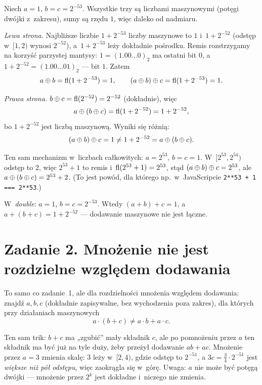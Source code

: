 \documentclass[11pt]{article}
\begin{document}
\formalnie
Niech $a=1$, $b=c=2^{-53}$. Wszystkie trzy są liczbami maszynowymi
(potęgi dwójki z~zakresu), sumy są rzędu $1$, więc daleko od nadmiaru.

\emph{Lewa strona.} Najbliższe liczbie $1+2^{-53}$ liczby maszynowe to $1$
i~$1+2^{-52}$ (odstęp w~$[1,2)$ wynosi $2^{-52}$), a~$1+2^{-53}$ leży
dokładnie pośrodku. Remis rozstrzygamy na korzyść parzystej mantysy:
$1=(1.00\ldots0)_2$ ma ostatni bit $0$, a~$1+2^{-52}=(1.00\ldots01)_2$ --- bit
$1$. Zatem
\[
a\mathbin{\oplus} b=\operatorname{fl}(1+2^{-53})=1,\qquad (a\mathbin{\oplus} b)\mathbin{\oplus} c=\operatorname{fl}(1+2^{-53})=1.
\]

\emph{Prawa strona.} $b\mathbin{\oplus} c=\operatorname{fl}(2^{-52})=2^{-52}$ (dokładnie), więc
\[
a\mathbin{\oplus}(b\mathbin{\oplus} c)=\operatorname{fl}(1+2^{-52})=1+2^{-52},
\]
bo $1+2^{-52}$ jest liczbą maszynową. Wyniki się różnią:
\[
(a\mathbin{\oplus} b)\mathbin{\oplus} c=1\ne1+2^{-52}=a\mathbin{\oplus}(b\mathbin{\oplus} c).
\]

\begin{uwaga}
Ten sam mechanizm w~liczbach całkowitych: $a=2^{53}$, $b=c=1$.
W~$[2^{53},2^{54})$ odstęp to $2$, więc $2^{53}+1$ to remis
i~$\operatorname{fl}(2^{53}+1)=2^{53}$, stąd $(a\mathbin{\oplus} b)\mathbin{\oplus} c=2^{53}$, ale
$a\mathbin{\oplus}(b\mathbin{\oplus} c)=2^{53}+2$. (To jest powód, dla którego np.\ w~JavaScripcie
\texttt{2**53 + 1 === 2**53}.)
\end{uwaga}

\begin{odpowiedz}
W~\emph{double}: $a=1$, $b=c=2^{-53}$. Wtedy
$(a+b)+c=1$, a~$a+(b+c)=1+2^{-52}$ --- dodawanie maszynowe nie jest łączne.
\end{odpowiedz}

\section{Zadanie 2. Mnożenie nie jest rozdzielne względem dodawania}
\begin{tresc}
To samo co zadanie~1, ale dla rozdzielności mnożenia względem dodawania:
znajdź $a,b,c$ (dokładnie zapisywalne, bez wychodzenia poza zakres), dla
których przy działaniach maszynowych
\[
a\cdot(b+c)\ne a\cdot b+a\cdot c.
\]
\end{tresc}

\begin{intuicja}
Ten sam trik: $b+c$ ma „zgubić” mały składnik $c$, ale po pomnożeniu przez
$a$ ten składnik ma być już na tyle duży, żeby przeżył dodawanie $ab+ac$.
Mnożenie przez $a=3$ zmienia skalę: $3$ leży w~$[2,4)$, gdzie odstęp to
$2^{-51}$, a $3c=\tfrac34\cdot2^{-51}$ jest \emph{większe niż pół odstępu},
więc zaokrągla się w~górę. Uwaga: $a$ nie może być potęgą dwójki ---
mnożenie przez $2^k$ jest dokładne i~niczego nie zmienia.
\end{intuicja}
\end{document}
